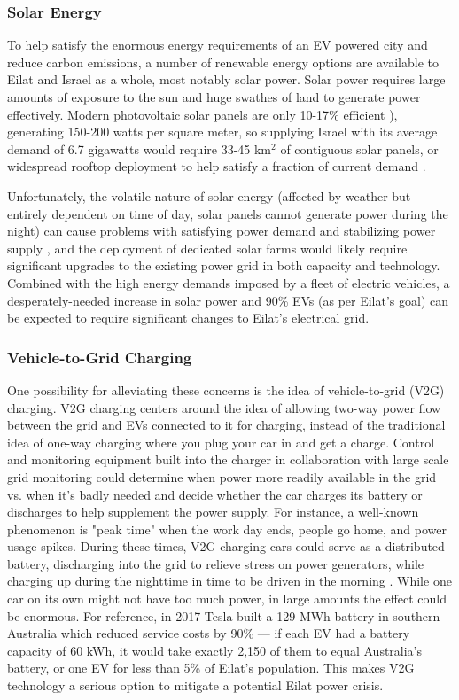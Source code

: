 \documentclass{article}                         %
\begin{document}
\subsubsection{Solar Energy}
To help satisfy the enormous energy requirements of an EV powered city and reduce carbon emissions, a number of renewable energy options are available to Eilat and Israel as a whole, most notably solar power. Solar power requires large amounts of exposure to the sun and huge swathes of land to generate power effectively. Modern photovoltaic solar panels are only 10-17\% efficient \cite{Zhu2015DistributedGrid}), generating 150-200 watts per square meter, so supplying Israel with its average demand of 6.7 gigawatts would require 33-45 km$^2$ of contiguous solar panels, or widespread rooftop deployment to help satisfy a fraction of current demand \cite{Vardimon2011AssessmentIsrael}.

Unfortunately, the volatile nature of solar energy (affected by weather but entirely dependent on time of day, solar panels cannot generate power during the night) can cause problems with satisfying power demand and stabilizing power supply \cite{Lu2015IntroductionPEVs}, and the deployment of dedicated solar farms would likely require significant upgrades to the existing power grid \cite{Vardimon2011AssessmentIsrael} in both capacity and technology. Combined with the high energy demands imposed by a fleet of electric vehicles, a desperately-needed increase in solar power and 90\% EVs (as per Eilat's goal) can be expected to require significant changes to Eilat's electrical grid.

\subsubsection{Vehicle-to-Grid Charging}
One possibility for alleviating these concerns is the idea of vehicle-to-grid (V2G) charging. V2G charging centers around the idea of allowing two-way power flow between the grid and EVs connected to it for charging, instead of the traditional idea of one-way charging where you plug your car in and get a charge. Control and monitoring equipment built into the charger in collaboration with large scale grid monitoring could determine when power more readily available in the grid vs. when it's badly needed and decide whether the car charges its battery or discharges to help supplement the power supply. For instance, a well-known phenomenon is "peak time" when the work day ends, people go home, and power usage spikes. During these times, V2G-charging cars could serve as a distributed battery, discharging into the grid to relieve stress on power generators, while charging up during the nighttime in time to be driven in the morning \cite{Mahmud2015PowerEV}. While one car on its own might not have too much power, in large amounts the effect could be enormous. For reference, in 2017 Tesla built a 129 MWh battery in southern Australia which reduced service costs by 90\% \cite{Lambert2018Teslas90} --- if each EV had a battery capacity of 60 kWh, it would take exactly 2,150 of them to equal Australia's battery, or one EV for less than 5\% of Eilat's population. This makes V2G technology a serious option to mitigate a potential Eilat power crisis.
\end{document}
